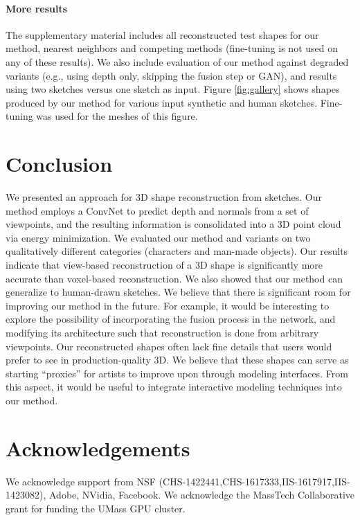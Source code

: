\documentclass[10pt, conference, compsocconf]{IEEEtran}
\begin{document}
\vspace{-1mm}\paragraph{More results} The supplementary material includes all  reconstructed test shapes for our  method, nearest neighbors and competing methods (fine-tuning is not used on any of these results). We also include evaluation of our method against degraded variants  (e.g., using depth only, skipping the fusion step or GAN), and results using two sketches versus one sketch as input.  Figure \ref{fig:gallery} shows  shapes produced by our method for various input synthetic and human sketches. Fine-tuning was used for the meshes of this figure.  



\vspace{-1mm}
\section{Conclusion}
\label{sec:conclusion}
\vspace{-2mm}
We presented an approach for 3D shape reconstruction from sketches.
Our method employs a ConvNet to predict depth and normals from a  set of viewpoints, and the resulting information is consolidated into a 3D point cloud via energy minimization. 
We evaluated our method and variants on two qualitatively different categories (characters and man-made objects). Our results indicate that view-based reconstruction of a 3D shape is significantly more accurate than voxel-based reconstruction. We also showed that our method can generalize  to human-drawn sketches. We believe that there is significant room for  improving our method in the future. For example, it would be interesting to explore the possibility of incorporating the fusion process  in the network, and modifying its architecture  such that reconstruction is done from  arbitrary viewpoints. Our  reconstructed shapes often lack fine details that users would prefer to see in production-quality 3D\models.
We believe that these shapes  can serve as  starting ``proxies'' for artists to  improve upon through modeling interfaces. From this aspect, it would be useful to integrate interactive modeling techniques into our method. 


\vspace{-2mm}\section*{Acknowledgements}\vspace{-2mm}
We acknowledge support from NSF (CHS-1422441,CHS-1617333,IIS-1617917,IIS-1423082), Adobe, NVidia, Facebook. We  acknowledge the MassTech Collaborative grant for funding the UMass GPU cluster.




{%


}
\end{document}
